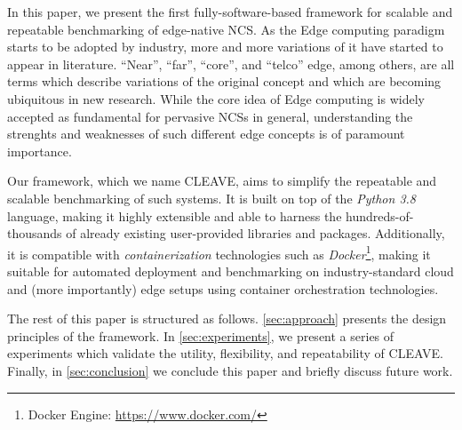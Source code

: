 In this paper, we present the first fully-software-based framework for scalable and repeatable benchmarking of edge-native \ac{NCS}.
As the Edge computing paradigm starts to be adopted by industry, more and more variations of it have started to appear in literature.
``Near'', ``far'', ``core'', and ``telco'' edge, among others, are all terms which describe variations of the original concept and which are becoming ubiquitous in new research.
While the core idea of Edge computing is widely accepted as fundamental for pervasive \acp{NCS} in general, understanding the strenghts and weaknesses of such different edge concepts is of paramount importance.

Our framework, which we name \ac{CLEAVE}, aims to simplify the repeatable and scalable benchmarking of such systems. 
It is built on top of the \emph{Python 3.8} language, making it highly extensible and able to harness the hundreds-of-thousands of already existing user-provided libraries and packages.
Additionally, it is compatible with \emph{containerization} technologies such as \emph{Docker}\footnote{Docker Engine: \url{https://www.docker.com/}}, making it suitable for automated deployment and benchmarking on industry-standard cloud and (more importantly) edge setups using container orchestration technologies.

The rest of this paper is structured as follows.
\cref{sec:approach} presents the design principles of the framework.
In \cref{sec:experiments}, we present a series of experiments which validate the utility, flexibility, and repeatability of \ac{CLEAVE}.
Finally, in \cref{sec:conclusion} we conclude this paper and briefly discuss future work.